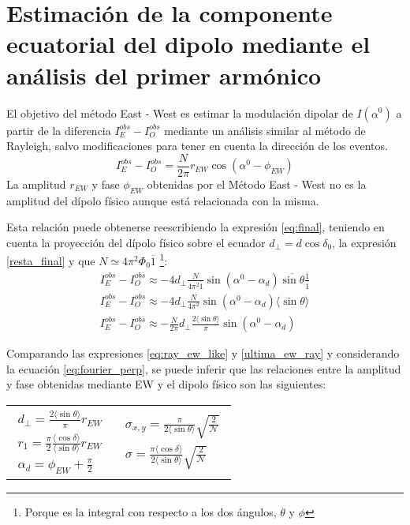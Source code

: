 \section{Estimación de la componente ecuatorial del dipolo mediante el análisis del  primer armónico}


El objetivo del método  East - West es estimar la modulación dipolar de  $I(\alpha^0)$ a partir de la diferencia $I^{obs}_E -  I^{obs}_O$ mediante un análisis similar al método de  Rayleigh, salvo modificaciones para tener en cuenta la dirección de los eventos. 
\begin{equation}
    I^{obs}_E -  I^{obs}_O = \frac{N}{2\pi} r_{EW} \cos(\alpha^0 -  \phi_{EW}) \label{eq:ray_ew_like}
\end{equation}
La amplitud $r_{EW}$ y fase $\phi_{EW}$ obtenidas por el Método  East - West no es la amplitud del dípolo físico aunque está relacionada con la misma. 


Esta relación puede obtenerse reescribiendo la expresión \ref{eq:final}, teniendo en cuenta la proyección del dípolo físico sobre el ecuador $d_{\perp}= d\cos\delta_0$, la expresión  \ref{resta_final} y que $N \simeq 4\pi^2 \Phi_0 \overline{1} $ \footnote{Porque es la integral con respecto a los dos ángulos, $\theta$ y $\phi$}:
\begin{align}
    I^{obs}_E -  I^{obs}_O \approx -4 d_\perp \frac{N}{ 4\pi^2\overline{1}} \sin(\alpha^0  - \alpha_d)\overline{\sin\theta} \frac{\overline{1}}{\overline{1}}\\
    I^{obs}_E -  I^{obs}_O \approx -4 d_\perp \frac{N}{ 4\pi^2} \sin(\alpha^0  - \alpha_d)\langle\sin\theta \rangle\\
    I^{obs}_E -  I^{obs}_O \approx -\frac{N}{2\pi} d_\perp \frac{2\langle\sin\theta \rangle }{\pi}\sin(\alpha^0  - \alpha_d) \label{ultima_ew_ray}
\end{align}


Comparando las expresiones \ref{eq:ray_ew_like} y \ref{ultima_ew_ray} y considerando la ecuación \ref{eq:fourier_perp}, se puede inferir que las relaciones entre la amplitud y fase obtenidas mediante EW y el dipolo físico son las siguientes:

\begin{tabular}{@{}p{.4\linewidth}@{}p{.5\linewidth}@{}}
    \begin{align}
        d_{\perp} = \frac{2\langle\sin\theta \rangle}{\pi} r_{EW} \label{dperp} \\
        r_1   =\frac{\pi}{2} \frac{\langle\cos\delta \rangle}{\langle\sin\theta \rangle} r_{EW} \label{r_fisico}  \\
        \alpha_d = \phi_{EW} + \frac{\pi}{2} \label{phase_fisico}
    \end{align}
    &    \begin{align}
        \sigma_{x,y} = \frac{\pi}{2\langle\sin\theta \rangle} \sqrt{\frac{2}{\mathcal{N}}}\\
        \sigma   = \frac{\pi \langle\cos\delta \rangle}{2\langle\sin\theta \rangle} \sqrt{\frac{2}{\mathcal{N}}}
    \end{align}
  \end{tabular}

